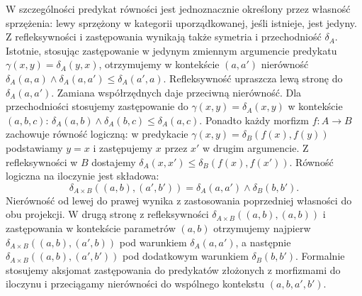 W szczególności predykat równości jest jednoznacznie określony przez własność sprzężenia: lewy sprzężony w kategorii uporządkowanej, jeśli istnieje, jest jedyny. Z refleksywności i zastępowania wynikają także symetria i przechodniość $\delta_A$. Istotnie, stosując zastępowanie w jedynym zmiennym argumencie predykatu $\gamma(x,y)=\delta_A(y,x)$, otrzymujemy w kontekście $(a,a')$ nierówność $\delta_A(a,a)\wedge\delta_A(a,a')\leq\delta_A(a',a)$. Refleksywność upraszcza lewą stronę do $\delta_A(a,a')$. Zamiana współrzędnych daje przeciwną nierówność. Dla przechodniości stosujemy zastępowanie do $\gamma(x,y)=\delta_A(x,y)$ w kontekście $(a,b,c)$: $\delta_A(a,b)\wedge\delta_A(b,c)\leq\delta_A(a,c)$. Ponadto każdy morfizm $f:A\to B$ zachowuje równość logiczną: w predykacie $\gamma(x,y)=\delta_B(f(x),f(y))$ podstawiamy $y=x$ i zastępujemy $x$ przez $x'$ w drugim argumencie. Z refleksywności w $B$ dostajemy $\delta_A(x,x')\leq\delta_B(f(x),f(x'))$. Równość logiczna na iloczynie jest składowa:
\[
 \delta_{A\times B}((a,b),(a',b'))
 =\delta_A(a,a')\wedge\delta_B(b,b').
\]
Nierówność od lewej do prawej wynika z zastosowania poprzedniej własności do obu projekcji. W drugą stronę z refleksywności $\delta_{A\times B}((a,b),(a,b))$ i zastępowania w kontekście parametrów $(a,b)$ otrzymujemy najpierw $\delta_{A\times B}((a,b),(a',b))$ pod warunkiem $\delta_A(a,a')$, a następnie $\delta_{A\times B}((a,b),(a',b'))$ pod dodatkowym warunkiem $\delta_B(b,b')$. Formalnie stosujemy aksjomat zastępowania do predykatów złożonych z morfizmami do iloczynu i przeciągamy nierówności do wspólnego kontekstu $(a,b,a',b')$.

